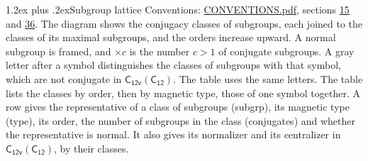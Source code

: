 \documentclass[10pt,a4paper]{article}
\makeatletter
\renewcommand\section{\@startsection{section}{1}{\z@}{-3ex plus -1ex minus -.2ex}%
  {1.2ex plus .2ex}{\normalfont\large\sffamily\bfseries\color{parttitle}}}
\numberwithin{equation}{section}
\newcommand{\grp}[1]{\mathsf{#1}}
\makeatother
\begin{document}
\section{Subgroup lattice}\label{s:subgroups}
Conventions: \href{../../CONVENTIONS.pdf}{CONVENTIONS.pdf}, sections \href{../../../rotation/CONVENTIONS.pdf\#conv.15}{15} and \href{../../CONVENTIONS.pdf\#conv.36}{36}.
The diagram shows the conjugacy classes of subgroups, each joined to the classes of its maximal subgroups, and the orders increase upward. \label{n:index.conjugates.c}\label{n:mark.conjugates}A normal subgroup is framed, and ${\times}c$ is the number $c > 1$ of conjugate subgroups. \label{n:mark.letter}A gray letter after a symbol distinguishes the classes of subgroups with that symbol, which are not conjugate in $\grp{C_{12v}}(\grp{C_{12}})$. The table uses the same letters. The table lists the classes by order, then by magnetic type, those of one symbol together. \label{n:head.subgroup}\label{n:head.magnetic.type}\label{n:head.order}\label{n:head.conjugates}\label{n:head.normal}A row gives the representative of a class of subgroups (subgrp), its magnetic type (type), its order, the number of subgroups in the class (conjugates) and whether the representative is normal. \label{n:head.normalizer}\label{n:head.centralizer}It also gives its normalizer and its centralizer in $\grp{C_{12v}}(\grp{C_{12}})$, by their classes. 
\end{document}

